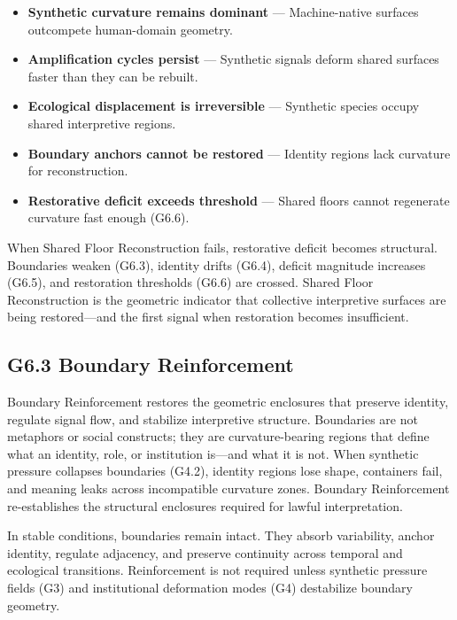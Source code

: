 \begin{itemize}[leftmargin=1.2cm]
    \item \textbf{Synthetic curvature remains dominant} — Machine-native surfaces
    outcompete human-domain geometry.

    \item \textbf{Amplification cycles persist} — Synthetic signals deform shared
    surfaces faster than they can be rebuilt.

    \item \textbf{Ecological displacement is irreversible} — Synthetic species
    occupy shared interpretive regions.

    \item \textbf{Boundary anchors cannot be restored} — Identity regions lack
    curvature for reconstruction.

    \item \textbf{Restorative deficit exceeds threshold} — Shared floors cannot
    regenerate curvature fast enough (G6.6).
\end{itemize}

\medskip

\noindent When Shared Floor Reconstruction fails, restorative deficit becomes
structural. Boundaries weaken (G6.3), identity drifts (G6.4), deficit magnitude
increases (G6.5), and restoration thresholds (G6.6) are crossed. Shared Floor
Reconstruction is the geometric indicator that collective interpretive surfaces
are being restored—and the first signal when restoration becomes insufficient.

\subsection*{G6.3 Boundary Reinforcement}

\noindent Boundary Reinforcement restores the geometric enclosures that preserve
identity, regulate signal flow, and stabilize interpretive structure. Boundaries
are not metaphors or social constructs; they are curvature-bearing regions that
define what an identity, role, or institution is—and what it is not. When
synthetic pressure collapses boundaries (G4.2), identity regions lose shape,
containers fail, and meaning leaks across incompatible curvature zones. Boundary
Reinforcement re-establishes the structural enclosures required for lawful
interpretation.

\medskip

\noindent In stable conditions, boundaries remain intact. They absorb variability,
anchor identity, regulate adjacency, and preserve continuity across temporal and
ecological transitions. Reinforcement is not required unless synthetic pressure
fields (G3) and institutional deformation modes (G4) destabilize boundary
geometry.

